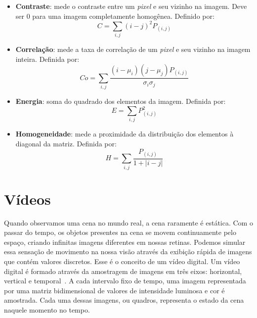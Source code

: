 \begin{itemize}

\item \textbf{Contraste}: mede o contraste entre um \textit{pixel} e seu vizinho na imagem. Deve ser 0 para uma imagem completamente homogênea. Definido por:
	\begin{equation}
		C = \sum_{i,j} (i-j)^{2}P_{(i,j)}
	\label{eq:Contraste}
	\end{equation}
	
\item \textbf{Correlação}: mede a taxa de correlação de um \textit{pixel} e seu vizinho na imagem inteira. Definida por:
	\begin{equation}
		Co = \sum_{i,j} \frac{(i - \mu_i)(j - \mu_j)P_{(i,j)}}{\sigma_i\sigma_j}
	\label{eq:Correlacao}
	\end{equation}
	
\item \textbf{Energia}: soma do quadrado dos elementos da imagem. Definida por:
	\begin{equation}
		E = \sum_{i,j} P_{(i,j)}^{2}
		\label{eq:Energia}
	\end{equation}
	
\item \textbf{Homogeneidade}: mede a proximidade da distribuição dos elementos à diagonal da matriz. Definida por:
	\begin{equation}
		H = \sum_{i,j} \frac{P_{(i,j)}}{1+|i-j|}
		\label{eq:Homo}
	\end{equation}

\end{itemize}


\section{Vídeos}\label{sec:video}


Quando observamos uma cena no mundo real, a cena raramente é estática. Com o passar do tempo, os objetos presentes na cena se movem continuamente pelo espaço, criando infinitas imagens diferentes em nossas retinas. Podemos simular essa sensação de movimento na nossa visão através da exibição rápida de imagens que contém valores discretos. Esse é o conceito de um vídeo digital. Um vídeo digital é formado através da amostragem de imagens	em três eixos: horizontal, vertical e temporal~\cite{LivroVideoDigital}. A cada intervalo fixo de tempo, uma imagem representada por uma matriz bidimensional de valores de intensidade luminosa e cor é amostrada. Cada uma dessas imagens, ou quadros, representa o estado da cena naquele momento no tempo.

